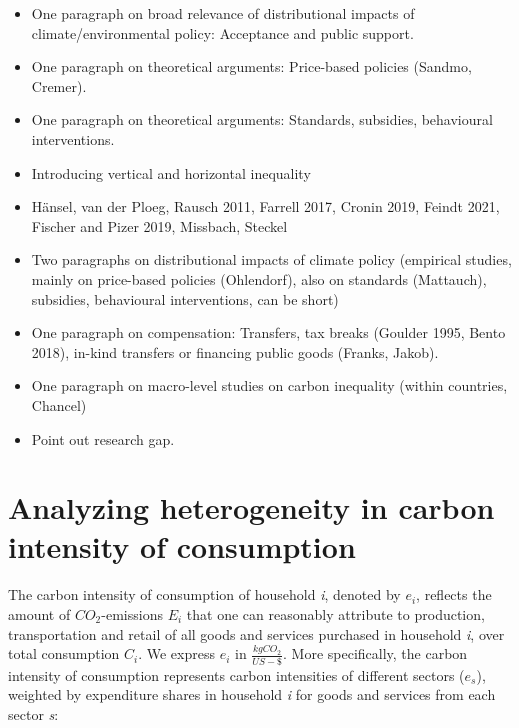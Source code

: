 \documentclass[12pt, a4paper]{article}
\begin{document}
\begin{itemize}
    \item One paragraph on broad relevance of distributional impacts of climate/environmental policy: Acceptance and public support.
    \item One paragraph on theoretical arguments: Price-based policies (Sandmo, Cremer).
    \item One paragraph on theoretical arguments: Standards, subsidies, behavioural interventions.
    \item Introducing vertical and horizontal inequality
  \item Hänsel, van der Ploeg, Rausch 2011, Farrell 2017, Cronin 2019, Feindt 2021, Fischer and Pizer 2019, Missbach, Steckel
  \item Two paragraphs on distributional impacts of climate policy (empirical studies, mainly on price-based policies (Ohlendorf), also on standards (Mattauch), subsidies, behavioural interventions, can be short)
  \item One paragraph on compensation: Transfers, tax breaks (Goulder 1995, Bento 2018), in-kind transfers or financing public goods (Franks, Jakob).
  \item One paragraph on macro-level studies on carbon inequality (within countries, Chancel)
  \item Point out research gap.

\end{itemize}

\section{Analyzing heterogeneity in carbon intensity of consumption} \label{sec:methods}


The carbon intensity of consumption of household \textit{i}, denoted by $e_{i}$, reflects the amount of $CO_{2}$-emissions $E_{i}$ that one can reasonably attribute to production, transportation and retail of all goods and services purchased in household \textit{i}, over total consumption $C_{i}$. We express $e_{i}$ in $\frac{kgCO_{2}}{US-\$}$. More specifically, the carbon intensity of consumption represents carbon intensities of different sectors ($e_{s}$), weighted by expenditure shares in household \textit{i} for goods and services from each sector \textit{s}:

\end{document}
